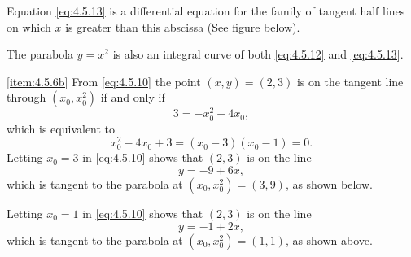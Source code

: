 \documentclass{ximera}
\begin{document}
\begin{example}
\begin{explanation}
\begin{center}
\end{center}
 
 
Equation \eqref{eq:4.5.13} is a
differential
equation for the family of tangent half lines on which $x$ is greater
than this abscissa (See figure below).

\begin{center}
\end{center}

 
The
parabola $y=x^2$ is also an integral curve of both \eqref{eq:4.5.12} and
\eqref{eq:4.5.13}.
 
\ref{item:4.5.6b}
From \eqref{eq:4.5.10} the point $(x,y)=(2,3)$ is on the tangent line
through $(x_0,x_0^2)$ if and only if
$$
3=-x_0^2+4x_0,
$$
which is equivalent to
$$
x_0^2-4x_0+3=(x_0-3)(x_0-1)=0.
$$
Letting $x_0=3$ in \eqref{eq:4.5.10} shows that $(2,3)$ is on the line
$$
y=-9+6x,
$$
which is tangent to the parabola at $(x_0,x_0^2)=(3,9)$, as shown below.

\begin{center}
\end{center}
 
 
 
Letting $x_0=1$ in \eqref{eq:4.5.10} shows that $(2,3)$ is on the line
$$
y=-1+2x,
$$
which is tangent to the parabola at $(x_0,x_0^2)=(1,1)$, as shown above.
\end{explanation}
\end{example}
 
\end{document}
